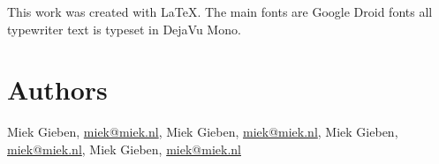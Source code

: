 This work was created with \LaTeX. The main fonts are Google Droid fonts all
typewriter text is typeset in DejaVu Mono.

\section{Authors}
Miek Gieben, \url{miek@miek.nl},
Miek Gieben, \url{miek@miek.nl},
Miek Gieben, \url{miek@miek.nl},
Miek Gieben, \url{miek@miek.nl}
